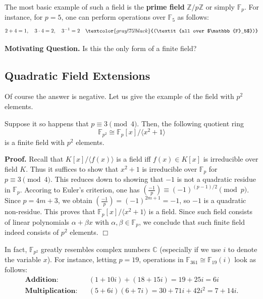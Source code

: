 \documentclass{template}
\newcommand{\qedwhite}{\hfill \ensuremath{\Box}}
\begin{document}
The most basic example of such a field is the \textbf{prime field}
$\mathbb{Z}/p\mathbb{Z}$ or simply $\mathbb{F}_p$. For instance, for $p=5$, one
can perform operations over $\mathbb{F}_5$ as follows:
\begin{gather*}
    2+4 = 1, \quad 3 \cdot 4 = 2, \quad 3^{-1} = 2 \quad \textcolor{gray!75!black}{(\textit{all over $\mathbb{F}_5$})}
\end{gather*}

\textbf{Motivating Question.} Is this the only form of a finite field?

\subsection{Quadratic Field Extensions}
Of course the answer is negative. Let us give the example of the field with
$p^2$ elements.

\begin{example}
    Suppose it so happens that $p \equiv 3 \pmod{4}$. Then, the 
    following quotient ring
    \begin{equation*}
        \mathbb{F}_{p^2} \cong \mathbb{F}_p[x] / \langle x^2+1 \rangle
    \end{equation*}
    is a finite field with $p^2$ elements.
\end{example}

\textbf{Proof.} Recall that $K[x]/\langle f(x) \rangle$ is a field iff
$f(x) \in K[x]$ is irreducible over field $K$. Thus it
suffices to show that $x^2+1$ is irreducible over $\mathbb{F}_p$ for $p \equiv 3
\pmod{4}$. This reduces down to showing that $-1$ is not a quadratic residue in
$\mathbb{F}_p$. Accoring to Euler's criterion, one has
$\left(\frac{-1}{p}\right) \equiv (-1)^{(p-1)/2} \pmod{p}$. Since $p=4m+3$, we
obtain $\left(\frac{-1}{p}\right) = (-1)^{2m+1} = -1$, so $-1$ is a quadratic
non-residue. This proves that $\mathbb{F}_p[x] / \langle x^2+1 \rangle$ is a
field. Since such field consists of linear polynomials $\alpha+\beta x$ with
$\alpha,\beta \in \mathbb{F}_p$, we conclude that such finite field indeed
consists of $p^2$ elements. \qedwhite

\begin{example}
    In fact, $\mathbb{F}_{p^2}$ greatly resembles complex numbers $\mathbb{C}$
    (especially if we use $i$ to denote the variable $x$). For instance, letting
    $p=19$, operations in $\mathbb{F}_{361} \cong \mathbb{F}_{19}(i)$ look as
    follows:
    \begin{align*}
        \textbf{Addition:} && (1+10i) + (18+15i) = 19+25i = 6i \\
        \textbf{Multiplication:} && (5+6i)(6+7i) = 30+71i+42i^2 = 7+14i.
    \end{align*} 
\end{example}
\end{document}
